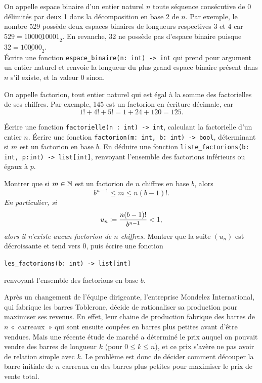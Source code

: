 \documentclass{magnoliaold}
\begin{document}
On appelle espace binaire d'un entier naturel $n$ toute séquence consécutive de 0 délimités
par deux 1 dans la décomposition en base 2 de $n$. Par exemple, le nombre 529 possède deux
espaces binaires de longueurs respectives 3 et 4 car $529=\underline{1000010001}_2$. En revanche, 32 ne
possède pas d'espace binaire puisque $32=\underline{100000}_2$.\\

Écrire une fonction \verb!espace_binaire(n: int) -> int! qui prend pour argument un entier naturel
et renvoie la longueur du plus grand espace binaire présent dans $n$ s'il existe, et la valeur
0 sinon.


On appelle factorion, tout entier naturel qui est égal à la somme des factorielles de
ses chiffres. Par exemple, 145 est un factorion en écriture décimale, car
\[1! + 4! + 5! = 1 + 24 + 120 = 125.\]
\begin{questions}
\question Écrire une fonction \verb!factorielle(n : int) -> int!, calculant la
  factorielle d'un entier $n$.
\question Écrire une fonction \verb!factorion(m: int, b: int) -> bool!, déterminant
  si $m$ est un factorion en base $b$.
\question En déduire une fonction \verb!liste_factorions(b: int, p:int) -> list[int]!,
  renvoyant l'ensemble des factorions inférieurs ou égaux à $p$. 
\question
\begin{questions}
\question Montrer que si $m\in\mathbb{N}$ est un factorion de $n$ chiffres en base $b$, alors
  \[b^{n-1} \leq m \leq n(b-1)!.\]
\emph{En particulier, si
  \[u_n \coloneqq \frac{n(b-1)!}{b^{n-1}}<1,\]
  alors il n'existe aucun factorion de $n$ chiffres.}
\question Montrer que la suite $(u_n)$ est décroissante et tend vers 0,
  puis écrire une fonction
\begin{center}
  \verb!les_factorions(b: int) -> list[int]!
\end{center}
  renvoyant l'ensemble des factorions en base $b$.
\end{questions}
\end{questions}

Après un changement de l'équipe dirigeante, l'entreprise Mondelez
International, qui fabrique les barres Toblerone, décide de rationaliser
sa production pour maximiser ses revenus. En effet, leur chaine de production
fabrique des barres de $n$ «~carreaux~» qui sont ensuite coupées en barres plus
petites avant d'être vendues. Mais une récente étude de marché a déterminé le
prix auquel on pouvait vendre des barres de longueur $k$ (pour
$0 \leq k \leq n$), et ce prix s'avère ne pas avoir de relation simple avec $k$.
Le problème est donc de décider comment découper la barre initiale de $n$
carreaux en des barres plus petites pour maximiser le prix de vente total.\\
\end{document}
